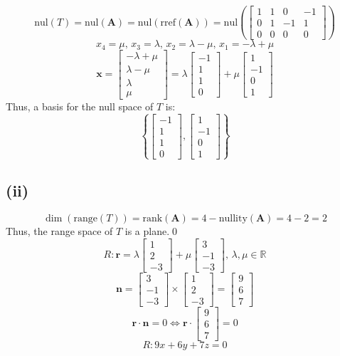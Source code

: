 \documentclass[a4paper]{article}
\newcommand{\vv}{\mathbf}
\newcommand{\rref}{\mathrm{rref}}
\newcommand{\nul}{\mathrm{nul}}
\newcommand{\range}{\mathrm{range}}
\newcommand{\nullity}{\mathrm{nullity}}
\newcommand{\rank}{\mathrm{rank}}
\begin{document}
	\[\nul(T)=\nul(\vv A)=\nul(\rref(\vv A))=\nul\left(\begin{bmatrix}1&1&0&-1\\0&1&-1&1\\0&0&0&0\end{bmatrix}\right)\]
	\[x_4=\mu,\,x_3=\lambda,\,x_2=\lambda-\mu,\,x_1=-\lambda+\mu\]
	\[\vv x=\begin{bmatrix}-\lambda+\mu\\\lambda-\mu\\\lambda\\\mu\end{bmatrix}
	=\lambda\begin{bmatrix}-1\\1\\1\\0\end{bmatrix}
	+\mu\begin{bmatrix}1\\-1\\0\\1\end{bmatrix}\]
	Thus, a basis for the null space of \(T\) is:
	\[\boxed{\left\{\begin{bmatrix}-1\\1\\1\\0\end{bmatrix},\begin{bmatrix}1\\-1\\0\\1\end{bmatrix}\right\}}\]

\subsection*{(ii)}
\[\dim(\range(T))=\rank(\vv A)=4-\nullity(\vv A)=4-2=2\]
Thus, the range space of \(T\) is a plane.\qed
\[R:\vv r=\lambda\begin{bmatrix}1\\2\\-3\end{bmatrix}
+\mu\begin{bmatrix}3\\-1\\-3\end{bmatrix},\,\lambda,\mu\in\mathbb R\]
\[\vv n=\begin{bmatrix}3\\-1\\-3\end{bmatrix}\times\begin{bmatrix}1\\2\\-3\end{bmatrix}=\begin{bmatrix}9\\6\\7\end{bmatrix}\]
\[\vv r\cdot\vv n=0\iff\vv r\cdot\begin{bmatrix}9\\6\\7\end{bmatrix}=0\]
\[R:\boxed{9x+6y+7z=0}\]
\end{document}
